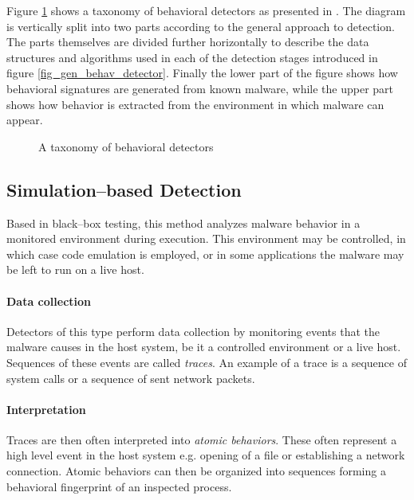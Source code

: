 Figure \ref{fig_behav_det_tax} shows a taxonomy of behavioral detectors as presented in \cite{Jacob08}. The diagram is vertically split into two parts according to the general approach to detection. The parts themselves are divided further horizontally to describe the data structures and algorithms used in each of the detection stages introduced in figure \ref{fig_gen_behav_detector}. Finally the lower part of the figure shows how behavioral signatures are generated from known malware, while the upper part shows how behavior is extracted from the environment in which malware can appear.

\begin{figure}[H]
    \centering
    \caption{A taxonomy of behavioral detectors}
    \label{fig_behav_det_tax}
\end{figure}

\subsection{Simulation--based Detection}
Based in black--box testing, this method analyzes malware behavior in a monitored environment during execution. This environment may be controlled, in which case code emulation is employed, or in some applications the malware may be left to run on a live host.

\paragraph*{Data collection} Detectors of this type perform data collection by monitoring events that the malware causes in the host system, be it a controlled environment or a live host. Sequences of these events are called \emph{traces}. An example of a trace is a sequence of system calls or a sequence of sent network packets.

\paragraph*{Interpretation} Traces are then often interpreted into \emph{atomic behaviors}. These often represent a high level event in the host system e.g. opening of a file or establishing a network connection. Atomic behaviors can then be organized into sequences forming a behavioral fingerprint of an inspected process.


